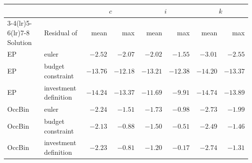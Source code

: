 \begin{tabular}{llrrrrrr}
\toprule
& & \multicolumn{2}{c}{$c$} & \multicolumn{2}{c}{$i$} & \multicolumn{2}{c}{$k$} \\ \cmidrule(lr){3-4}\cmidrule(lr){5-6}\cmidrule(lr){7-8} Solution & Residual of & mean & max & mean & max & mean & max \\
\midrule
EP & euler & $-2.52$ & $-2.07$ & $-2.02$ & $-1.55$ & $-3.01$ & $-2.55$ \\
EP & budget constraint & $-13.76$ & $-12.18$ & $-13.21$ & $-12.38$ & $-14.20$ & $-13.37$ \\
EP & investment definition & $-14.24$ & $-13.37$ & $-11.69$ & $-9.91$ & $-14.74$ & $-13.89$ \\
OccBin & euler & $-2.24$ & $-1.51$ & $-1.73$ & $-0.98$ & $-2.73$ & $-1.99$ \\
OccBin & budget constraint & $-2.13$ & $-0.88$ & $-1.50$ & $-0.51$ & $-2.49$ & $-1.46$ \\
OccBin & investment definition & $-2.23$ & $-0.81$ & $-1.20$ & $-0.17$ & $-2.74$ & $-1.31$ \\
\bottomrule
\end{tabular}
